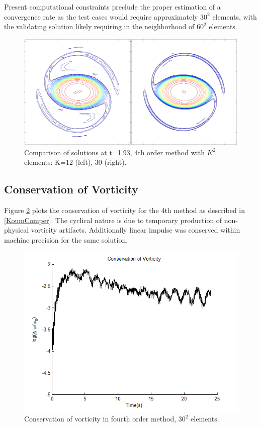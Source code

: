 \documentclass[letterpaper,12pt]{report}
\begin{document}
Present computational constraints preclude the proper estimation of a convergence rate as the test cases would require approximately $30^2$ elements, with the validating solution likely requiring in the neighborhood of $60^2$ elements.

\begin{figure}
\centering
\includegraphics[width=1\textwidth]{KoumNonConverge.PNG}
\caption{\label{fig:KoumNonConverge}Comparison of solutions at t=1.93, 4th order method with $K^2$ elements: K=12 (left), 30 (right).}
\end{figure}
%
\subsection{Conservation of Vorticity}
Figure \ref{fig:KoumWConserve} plots the conservation of vorticity for the 4th method as described in \ref{KoumComper}. The cyclical nature is due to temporary production of non-physical vorticity artifacts. Additionally linear impulse was conserved within machine precision for the same solution.

\begin{figure}
\centering
\includegraphics[width=1\textwidth]{KoumWConserve.PNG}
\caption{\label{fig:KoumWConserve}Conservation of vorticity in fourth order method, $30^2$ elements.}
\end{figure}
\end{document}

